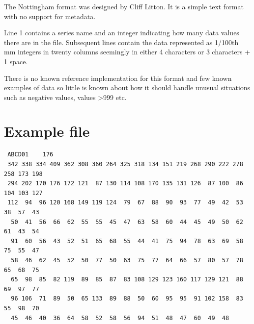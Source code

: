 The Nottingham format was designed by Cliff Litton. It is a simple text format with no support for metadata.

Line 1 contains a series name and an integer indicating how many data values there are in the file. Subsequent lines contain the data represented as 1/100th mm integers in twenty columns seemingly in either 4 characters or 3 characters + 1 space.

There is no known reference implementation for this format and few known examples of data so little is known about how it should handle unusual situations such as negative values, values >999 etc. 

\newpage
\section{Example file}

\begin{lstlisting}
 ABCD01    176
 342 338 334 409 362 308 360 264 325 318 134 151 219 268 290 222 278 258 173 198
 294 202 170 176 172 121  87 130 114 108 170 135 131 126  87 100  86 104 103 127
 112  94  96 120 168 149 119 124  79  67  88  90  93  77  49  42  53  38  57  43
  50  41  56  66  62  55  55  45  47  63  58  60  44  45  49  50  62  61  43  54
  91  60  56  43  52  51  65  68  55  44  41  75  94  78  63  69  58  75  55  47
  58  46  62  45  52  50  77  50  63  75  77  64  66  57  80  57  78  65  68  75
  65  98  85  82 119  89  85  87  83 108 129 123 160 117 129 121  88  69  97  77
  96 106  71  89  50  65 133  89  88  50  60  95  95  91 102 158  83  55  98  70
  45  46  40  36  64  58  52  58  56  94  51  48  47  60  49  48
\end{lstlisting}

